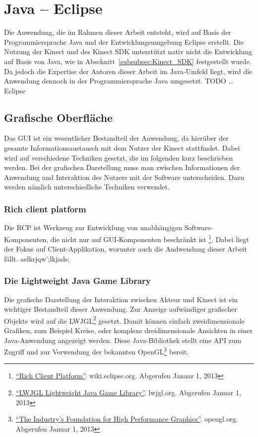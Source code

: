 \section{Java -- Eclipse}
Die Anwendung, die im Rahmen dieser Arbeit entsteht, wird auf Basis der Programmiersprache Java und der Entwicklungsumgebung Eclipse erstellt.
Die Nutzung der Kinect und des Kinect SDK unterst\"utzt nativ nicht die Entwicklung auf Basis von Java, wie in Abschnitt~\ref{subsubsec:Kinect_SDK}
festgestellt wurde. Da jedoch die Expertise der Autoren dieser Arbeit im Java-Umfeld liegt, wird die Anwendung dennoch in der Programmiersprache Java umgesetzt.
TODO \ldots Eclipse

\subsection{Grafische Oberfl\"ache}
Das \gls{GUI} ist ein wesentlicher Bestandteil der Anwendung, da hier\"uber der gesamte Informationsaustausch mit dem Nutzer der Kinect stattfindet.
Dabei wird auf verschiedene Techniken gesetzt, die im folgenden kurz beschrieben werden.
\newline
Bei der grafischen Darstellung muss man zwischen Informationen der Anwendung und Interaktion des Nutzers mit der Software unterscheiden. Dazu werden n\"amlich unterschiedliche Techniken verwendet.

\subsubsection{Rich client platform}
Die \gls{RCP} ist Werkzeug zur Entwicklung von unabh\"angigen Software-Komponenten, die nicht nur auf \acrshort{GUI}-Komponenten beschr\"ankt ist
\footnote{\href{http://wiki.eclipse.org/index.php/Rich_Client_Platform}{\enquote{Rich Client Platform}}. wiki.eclipse.org. Abgerufen Januar 1, 2013}.
Dabei liegt der Fokus auf Client-Applikation, worunter auch die Andwendung dieser Arbeit f\"allt.
aelkrjqw';lkjads; 
 
\subsubsection{Die Lightweight Java Game Library}
Die grafische Darstellung der Interaktion zwischen Akteur und Kinect ist ein wichtiger Bestandteil dieser Anwendung.
Zur Anzeige aufw\"andiger grafischer Objekte wird auf die \gls{LWJGL}\footnote{\href{http://www.lwjgl.org/}{\enquote{LWJGL Lightweight Java Game Library}}. lwjgl.org. Abgerufen Januar 1, 2013} gesetzt.
Damit k\"onnen einfach zweidimensionale Grafiken, zum Beispiel Kreise, oder komplexe dreidimensionale Ansichten in einer Java-Anwendung angezeigt werden.
Diese Java-Bibliothek stellt eine API zum Zugriff und zur Verwendung der bekannten \gls{OpenGL}\footnote{\href{https://www.opengl.org/}{\enquote{The Industry's Foundation for High Performance Graphics}}. opengl.org. Abgerufen Januar 1, 2013} bereit.

